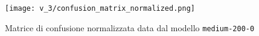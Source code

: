     \begin{figure}[h]
        \centering
        \texttt{[image: v\_3/confusion\_matrix\_normalized.png]}
        \caption{Matrice di confusione normalizzata data dal modello \texttt{medium-200-0}}
        \label{fig:v3-4}
    \end{figure}

